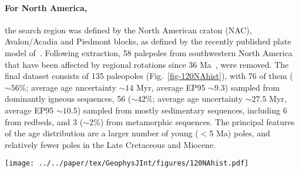 \paragraph{For North America,}
the search region was defined by the North American craton (NAC), Avalon/Acadia
and Piedmont blocks, as defined by the recently published plate model
of~\citet{Y18}. Following extraction, 58 palepoles from southwestern North America
that have been affected by regional rotations since 36 Ma~\citep{Mc06}, were
removed. The final dataset consists of 135 paleopoles (Fig.~\ref{fig-120NAhist}),
with 76 of them (${\sim}56$\%; average age uncertainty ${\sim}14$ Myr, average
EP95 ${\sim}9.3$\degree) sampled from dominantly igneous sequences, 56
(${\sim}42$\%; average age uncertainty ${\sim}27.5$ Myr, average EP95 ${\sim}10.5$\degree)
sampled from mostly sedimentary sequences, including 6 from redbeds, and 3
(${\sim}2$\%) from metamorphic sequences. The principal features of the age
distribution are a larger number of young ($<$5 Ma) poles, and relatively fewer
poles in the Late Cretaceous and Miocene.

\begin{figure*}
\centering
\texttt{[image: ../../paper/tex/GeophysJInt/figures/120NAhist.pdf]}
\caption[Distribution of 120 Ma North American paleopoles]{Temporal
distribution of 120 Ma $NAC$ paleopoles in 10 Myr window length and
5 Myr step length. For distribution a, each bin only counts in the midpoints
(circles) of pole uncertainty bars (not including those right at bin edges); For
distribution b, as long as the bar intersects with the bin (not including those
intersecting only at one of bin edges), it is counted in. Inside the
parentheses, i means igneous rocks derived (red bars; only two poles,
83 Ma and 80 Ma, from igneous and also sedimentary;
only one pole, 72 Ma, from igneous and also metamorphic), r means
sedimentary rocks with redbeds involved derived (orange bars), and m means
metamorphic rocks derived (blue bars); the left are non-redbed sedimentary rocks
derived (black bars; only two poles, 146 Ma [RESULTNO 6679] and
2 Ma [RESULTNO 1227], are from sedimentary and also metamorphic).
The data published before 1984 are shown as circles with a
dot.}\label{fig-120NAhist}
\end{figure*}

